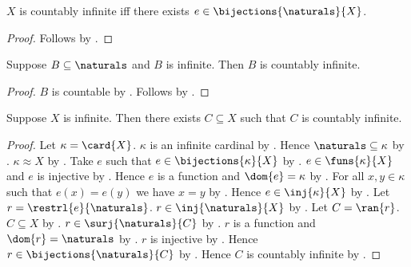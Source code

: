 \begin{theorem}\label{countably_infinite_iff_natural_bijection}
    $X$ is countably infinite iff
        there exists $e\in\bijections{\naturals}{X}$.
\end{theorem}
\begin{proof}
    Follows by
        .
\end{proof}

\begin{theorem}\label{infinite_subset_of_naturals_is_countably_infinite}
    Suppose $B\subseteq\naturals$ and $B$ is infinite.
    Then $B$ is countably infinite.
\end{theorem}
\begin{proof}
    $B$ is countable
        by .
    Follows by .
\end{proof}

\begin{theorem}\label{infinite_set_has_countably_infinite_subset}
    Suppose $X$ is infinite.
    Then there exists $C\subseteq X$ such that $C$ is countably infinite.
\end{theorem}
\begin{proof}
    Let $\kappa=\card{X}$.
    $\kappa$ is an infinite cardinal
        by .
    Hence $\naturals\subseteq\kappa$
        by .
    $\kappa\approx X$ by .
    Take $e$ such that $e\in\bijections{\kappa}{X}$ by .
    $e\in\funs{\kappa}{X}$ and $e$ is injective
        by .
    Hence $e$ is a function and $\dom{e}=\kappa$
        by .
    For all $x,y\in\kappa$ such that $e(x)=e(y)$ we have $x=y$
        by .
    Hence $e\in\inj{\kappa}{X}$ by .
    Let $r=\restrl{e}{\naturals}$.
    $r\in\inj{\naturals}{X}$ by .
    Let $C=\ran{r}$.
    $C\subseteq X$ by .
    $r\in\surj{\naturals}{C}$ by .
    $r$ is a function and $\dom{r}=\naturals$
        by .
    $r$ is injective by .
    Hence $r\in\bijections{\naturals}{C}$ by .
    Hence $C$ is countably infinite
        by .
\end{proof}
